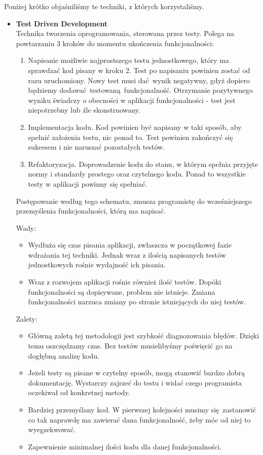     Poniżej krótko objaśniliśmy te techniki, z których korzystaliśmy.
    \begin{itemize}
      \item \textbf{Test Driven Development}\cite{tdd} \\
        Technika tworzenia oprogramowania, sterowana przez testy. Polega na powtarzaniu 3 kroków do momentu ukończenia funkcjonalności:
        \begin{enumerate}
          \item Napisanie możliwie najprostszego testu jednostkowego, który ma sprawdzać kod pisany w kroku 2. Test po napisaniu powinien zostać od razu uruchomiony. Nowy test musi dać wynik negatywny, gdyż dopiero będziemy dodawać testowaną funkcjonalność. Otrzymanie pozytywnego wyniku świadczy o obecności w aplikacji funkcjonalności - test jest niepotrzebny lub źle skonstruowany.
          \item Implementacja kodu. Kod powinien być napisany w taki sposób, aby spełnić założenia testu, nic ponad to. Test powinien zakończyć się sukcesem i nie naruszać pozostałych testów.
          \item Refaktoryzacja. Doprowadzenie kodu do stanu, w którym spełnia przyjęte normy i standardy prostego oraz czytelnego kodu\cite{scs}. Ponad to wszystkie testy w aplikacji powinny się spełniać.
        \end{enumerate}

        Postępowanie według tego schematu, zmusza programistę do wcześniejszego przemyślenia funkcjonalności, którą ma napisać.

        Wady:
        \begin{itemize}
          \item Wydłuża się czas pisania aplikacji, zwłaszcza w początkowej fazie wdrażania tej techniki. Jednak wraz z ilością napisanych testów jednostkowych rośnie wydajność ich pisania.
          \item Wraz z rozwojem aplikacji rośnie również ilość testów. Dopóki funkcjonalności są dopisywane, problem nie istnieje. Zmiana funkcjonalności narzuca zmiany po stronie istniejących do niej testów.
        \end{itemize}

        Zalety:
        \begin{itemize}
          \item Główną zaletą tej metodologii jest szybkość diagnozowania błędów. Dzięki temu oszczędzamy czas. Bez testów musielibyśmy poświęcić go na dogłębną analizę kodu.
          \item Jeżeli testy są pisane w czytelny sposób, mogą stanowić bardzo dobrą dokumentację. Wystarczy zajrzeć do testu i widać czego programista oczekiwał od konkretnej metody.
          \item Bardziej przemyślany kod. W pierwszej kolejności musimy się zastanowić co tak naprawdę ma zawierać dana funkcjonalność, żeby móc od niej to wyegzekwować.
          \item Zapewnienie minimalnej ilości kodu dla danej funkcjonalności.
        \end{itemize}


\end{itemize}
